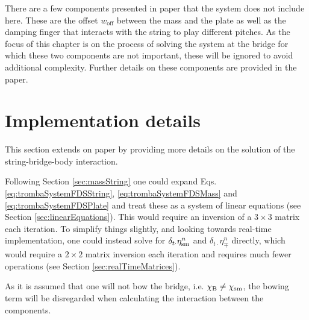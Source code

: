 There are a few components presented in paper \citeP[D] that the system does not include here. These are the offset $w_\text{off}$ between the mass and the plate as well as the damping finger that interacts with the string to play different pitches. As the focus of this chapter is on the process of solving the system at the bridge for which these two components are not important, these will be ignored to avoid additional complexity. Further details on these components are provided in the paper.

\section{Implementation details}
This section extends on paper \citeP[D] by providing more details on the solution of the string-bridge-body interaction.

Following Section \ref{sec:massString} one could expand Eqs. \eqref{eq:trombaSystemFDSString}, \eqref{eq:trombaSystemFDSMass} and \eqref{eq:trombaSystemFDSPlate} and treat these as a system of linear equations (see Section \ref{sec:linearEquations}). This would require an inversion of a $3\times 3$ matrix each iteration.
To simplify things slightly, and looking towards real-time implementation, one could instead solve for $\delta_{t\cdot}\eta_{\text{sm}}^n$ and $\delta_{t\cdot}\eta_\mp^n$ directly, which would require a $2\times 2$ matrix inversion each iteration and requires much fewer operations (see Section \ref{sec:realTimeMatrices}).

As it is assumed that one will not bow the bridge, i.e. $\chi_\text{B} \neq \chi_{\text{sm}}$, the bowing term will be disregarded when calculating the interaction between the components. 

